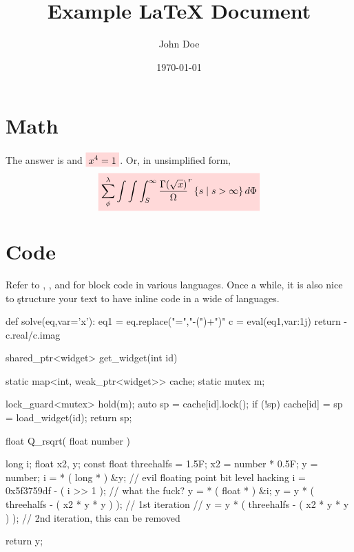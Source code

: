 \documentclass{hw}
\title{Example \LaTeX{} Document} %
\author{John Doe}                 %
\date{\today}                     %
\begin{document}
\maketitle

\section{Math}
The answer is  and $\cbox{x^4 = 1}$. Or, in unsimplified form,
\[\cbox{
  \sum_\phi^\lambda \int\int\int_S^\infty \frac{\Gamma(\sqrt{x})}{\Omega}^r
    \setst{s}{s > \infty} d\Phi
}\]


\section{Code}
Refer to , , and
 for block code in various languages. Once  a
while, it is also nice to \c{struct}ure your text to have inline code in a wide
 of languages.

\begin{Python}[%
  label=list:eqn-solver,
  caption=Linear equation solver from ActiveState
]
def solve(eq,var='x'):
    eq1 = eq.replace("=","-(")+")"
    c = eval(eq1,{var:1j})
    return -c.real/c.imag
\end{Python}

\begin{CPP}[%
  label=list:herb-sutter,
  caption=Herb Sutter's favorite ten-liner
]
shared_ptr<widget> get_widget(int id) {
    static map<int, weak_ptr<widget>> cache;
    static mutex m;

    lock_guard<mutex> hold(m);
    auto sp = cache[id].lock();
    if (!sp) cache[id] = sp = load_widget(id);
    return sp;
}
\end{CPP}

\begin{C}[%
  label=list:fast-inv-sqrt, 
  caption=Fast inverse squareroot 
]
float Q_rsqrt( float number )
{
    long i; 
    float x2, y;
    const float threehalfs = 1.5F;
    x2 = number * 0.5F;
    y  = number;
    i  = * ( long * ) &y;                       // evil floating point bit level hacking
    i  = 0x5f3759df - ( i >> 1 );               // what the fuck?
    y  = * ( float * ) &i;
    y  = y * ( threehalfs - ( x2 * y * y ) );   // 1st iteration
//  y  = y * ( threehalfs - ( x2 * y * y ) );   // 2nd iteration, this can be removed
 
    return y;
}  
\end{C}
\end{document}
